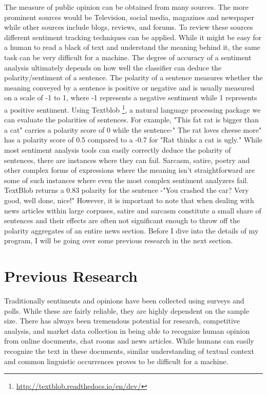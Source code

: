 \documentclass{acm_proc_article-sp}
\begin{document}
The measure of public opinion can be obtained from many sources. The more prominent sources would be Television, social media, magazines and newspaper while other sources include blogs, reviews, and forums. To review these sources different sentiment tracking techniques can be applied. While it might be easy for a human to read a black of text and understand the meaning behind it, the same task can be very difficult for a machine. The degree of accuracy of a sentiment analysis ultimately depends on how well the classifier can deduce the polarity/sentiment of a sentence. The polarity of a sentence measures whether the meaning conveyed by a sentence is positive or negative and is usually measured on a scale of -1 to 1, where -1 represents a negative sentiment while 1 represents a positive sentiment. Using Textblob \footnote{\url{http://textblob.readthedocs.io/en/dev/}}, a natural language processing package we can evaluate the polarities of sentences. For example, "This fat rat is bigger than a cat" carries a polarity score of 0 while the sentence-" The rat loves cheese more" has a polarity score of 0.5 compared to a -0.7 for "Rat thinks a cat is ugly." While most sentiment analysis tools can easily correctly deduce the polarity of sentences, there are instances where they can fail. Sarcasm, satire, poetry and other complex forms of expressions where the meaning isn't straightforward are some of such instances where even the most complex sentiment analyzers fail. TextBlob returns a 0.83 polarity for the sentence -"You crashed the car? Very good, well done, nice!" However, it is important to note that when dealing with news articles within large corpuses, satire and sarcasm constitute a small share of sentences and their effects are often not significant enough to throw off the polarity aggregates of an entire news section. Before I dive into the details of my program, I will be going over some previous research in the next section. 


\section{Previous Research}


Traditionally sentiments and opinions have been collected using surveys and polls. While these are fairly reliable, they are highly dependent on the sample size. There has always been tremendous potential for research, competitive analysis, and market data collection in being able to recognize human opinion from online documents, chat rooms and news articles. While humans can easily recognize the text in these documents, similar understanding of textual context and common linguistic occurrences proves to be difficult for a machine. 
\end{document}
